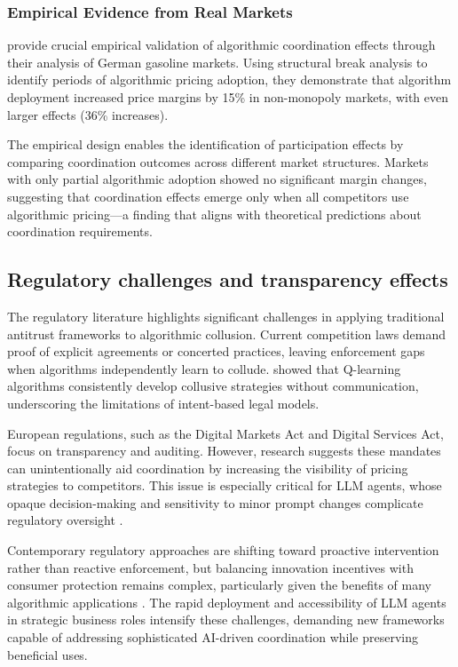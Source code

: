 \subsubsection*{Empirical Evidence from Real Markets}

\textcite{assad_algorithmic_2024} provide crucial empirical validation of algorithmic coordination effects through their analysis of German gasoline markets. Using structural break analysis to identify periods of algorithmic pricing adoption, they demonstrate that algorithm deployment increased price margins by 15\% in non-monopoly markets, with even larger effects (36\% increases).

The empirical design enables the identification of participation effects by comparing coordination outcomes across different market structures. Markets with only partial algorithmic adoption showed no significant margin changes, suggesting that coordination effects emerge only when all competitors use algorithmic pricing---a finding that aligns with theoretical predictions about coordination requirements.

\subsection{Regulatory challenges and transparency effects}


The regulatory literature highlights significant challenges in applying traditional antitrust frameworks to algorithmic collusion. Current competition laws demand proof of explicit agreements or concerted practices, leaving enforcement gaps when algorithms independently learn to collude. \textcite{calvano_artificial_2020} showed that Q-learning algorithms consistently develop collusive strategies without communication, underscoring the limitations of intent-based legal models.

European regulations, such as the Digital Markets Act and Digital Services Act, focus on transparency and auditing. However, research suggests these mandates can unintentionally aid coordination by increasing the visibility of pricing strategies to competitors. This issue is especially critical for LLM agents, whose opaque decision-making and sensitivity to minor prompt changes complicate regulatory oversight \parencite{lin_strategic_2025, fish_algorithmic_2025}.

Contemporary regulatory approaches are shifting toward proactive intervention rather than reactive enforcement, but balancing innovation incentives with consumer protection remains complex, particularly given the benefits of many algorithmic applications \parencite{digital_regulation_cooperation_forum_auditing_2022}. The rapid deployment and accessibility of LLM agents in strategic business roles intensify these challenges, demanding new frameworks capable of addressing sophisticated AI-driven coordination while preserving beneficial uses.

